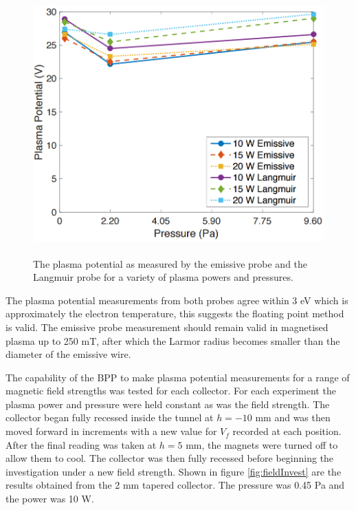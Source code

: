 \begin{figure}[H]
\centering
\includegraphics[width=1.0\textwidth, height = 10cm]{emVSlp.png}
\caption{The plasma potential as measured by the emissive probe and the Langmuir probe for a variety of plasma powers and pressures.}
\label{fig:emVSlp}
\end{figure}
The plasma potential measurements from both probes agree within 3 eV which is approximately the electron temperature, this suggests the floating point method is valid. The emissive probe measurement should remain valid in magnetised plasma up to 250 mT, after which the Larmor radius becomes smaller than the diameter of the emissive wire. 


The capability of the BPP to make plasma potential measurements for a range of magnetic field strengths was tested for each collector. For each experiment the plasma power and pressure were held constant as was the field strength. The collector began fully recessed inside the tunnel at $h = - 10$ mm and was then moved forward in increments with a new value for $V_f$ recorded at each position. After the final reading was taken at $h = 5$ mm, the magnets were turned off to allow them to cool. The collector was then fully recessed before beginning the investigation under a new field strength. Shown in figure \ref{fig:fieldInvest} are the results obtained from the 2 mm tapered collector. The pressure was 0.45 Pa and the power was 10 W.


